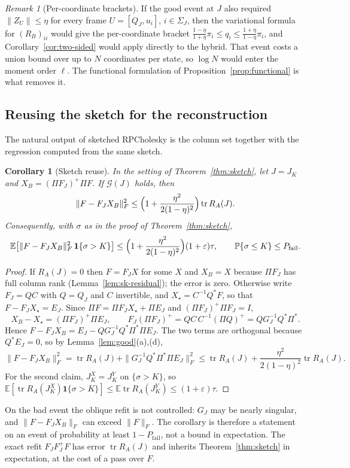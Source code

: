 \documentclass[11pt]{article}
\newtheorem{corollary}[theorem]{Corollary}
\theoremstyle{definition}\newtheorem{definition}[theorem]{Definition}
\theoremstyle{remark}\newtheorem{remark}[theorem]{Remark}
\newcommand{\E}{\mathbb E}
\newcommand{\Prob}{\mathbb P}
\newcommand{\eps}{\varepsilon}
\newcommand{\tr}{\operatorname{tr}}
\newcommand{\calG}{\mathcal G}
\newcommand{\1}{\mathbf 1}
\newcommand{\Pfail}{P_{\mathrm{fail}}}
\begin{document}
\begin{remark}[Per-coordinate brackets]\label{rem:per-coordinate}
If the good event at $J$ also required $\|Z_{U}\|\le\eta$ for every
frame $U=[Q_J,u_i]$, $i\in\Sigma_J$, then the variational formula for
$(R_B)_{ii}$ would give the per-coordinate bracket
$\frac{1-\eta}{1+\eta}\pi_i\le q_i\le\frac{1+\eta}{1-\eta}\pi_i$, and
Corollary~\ref{cor:two-sided} would apply directly to the hybrid. That
event costs a union bound over up to $N$ coordinates per state, so
$\log N$ would enter the moment order $\ell$. The functional
formulation of Proposition~\ref{prop:functional} is what removes it.
\end{remark}
\subsection{Reusing the sketch for the reconstruction}
The natural output of sketched RPCholesky is the column set together
with the regression computed from the same sketch.

\begin{corollary}[Sketch reuse]\label{cor:reuse}
In the setting of Theorem~\ref{thm:sketch}, let $J=J_K$ and
$X_B=(\Pi F_J)^+\Pi F$. If $\calG(J)$ holds, then
\[
 \|F-F_JX_B\|_F^2\le\Bigl(1+\frac{\eta^2}{2(1-\eta)^2}\Bigr)\tr R_A(J).
\]
Consequently, with $\sigma$ as in the proof of Theorem~\ref{thm:sketch},
\[
 \E\bigl[\|F-F_JX_B\|_F^2\,\1\{\sigma>K\}\bigr]
 \le\Bigl(1+\frac{\eta^2}{2(1-\eta)^2}\Bigr)(1+\eps)\tau,
 \qquad \Prob\{\sigma\le K\}\le\Pfail .
\]
\end{corollary}
\begin{proof}
If $R_A(J)=0$ then $F=F_JX$ for some $X$ and $X_B=X$ because $\Pi F_J$
has full column rank (Lemma~\ref{lem:sk-residual}); the error is zero.
Otherwise write $F_J=QC$ with $Q=Q_J$ and $C$ invertible, and
$X_\star=C^{-1}Q^*F$, so that $F-F_JX_\star=E_J$. Since
$\Pi F=\Pi F_JX_\star+\Pi E_J$ and $(\Pi F_J)^+\Pi F_J=I$,
\[
 X_B-X_\star=(\Pi F_J)^+\Pi E_J,\qquad
 F_J(\Pi F_J)^+=QC\,C^{-1}(\Pi Q)^+=QG_J^{-1}Q^*\Pi^* .
\]
Hence $F-F_JX_B=E_J-QG_J^{-1}Q^*\Pi^*\Pi E_J$. The two terms are
orthogonal because $Q^*E_J=0$, so by Lemma~\ref{lem:good}(a),(d),
\[
 \|F-F_JX_B\|_F^2=\tr R_A(J)+\|G_J^{-1}Q^*\Pi^*\Pi E_J\|_F^2
 \le\tr R_A(J)+\frac{\eta^2}{2(1-\eta)^2}\tr R_A(J).
\]
For the second claim, $J^X_K=J^Y_K$ on $\{\sigma>K\}$, so
$\E[\tr R_A(J^X_K)\1\{\sigma>K\}]\le\E\tr R_A(J^Y_K)\le(1+\eps)\tau$.
\end{proof}

On the bad event the oblique refit is not controlled: $G_J$ may be
nearly singular, and $\|F-F_JX_B\|_F$ can exceed $\|F\|_F$. The
corollary is therefore a statement on an event of probability at least
$1-\Pfail$, not a bound in expectation. The exact refit
$F_JF_J^+F$ has error $\tr R_A(J)$ and inherits
Theorem~\ref{thm:sketch} in expectation, at the cost of a pass over $F$.
\end{document}
